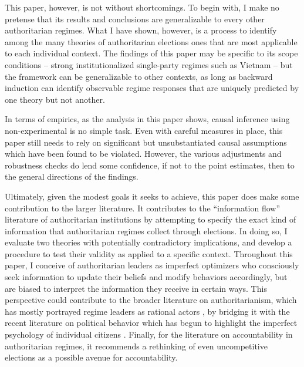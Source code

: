 \documentclass[12pt]{article}\usepackage[]{graphicx}\usepackage[]{color}
\newcommand{\1}{\mathbbm{1}}
\begin{document}
This paper, however, is not without shortcomings. To begin with, I make no pretense that its results and conclusions are generalizable to every other authoritarian regimes. What I have shown, however, is a process to identify among the many theories of authoritarian elections ones that are most applicable to each individual context. The findings of this paper may be specific to its scope conditions -- strong institutionalized single-party regimes such as Vietnam -- but the framework can be generalizable to other contexts, as long as backward induction can identify observable regime responses that are uniquely predicted by one theory but not another. 

In terms of empirics, as the analysis in this paper shows, causal inference using non-experimental is no simple task. Even with careful measures in place, this paper still needs to rely on significant but unsubstantiated causal assumptions which have been found to be violated. However, the various adjustments and robustness checks do lend some confidence, if not to the point estimates, then to the general directions of the findings.

Ultimately, given the modest goals it seeks to achieve, this paper does make some contribution to the larger literature. It contributes to the ``information flow'' literature of authoritarian institutions by attempting to specify the exact kind of information that authoritarian regimes collect through elections. In doing so, I evaluate two theories with potentially contradictory implications, and develop a procedure to test their validity as applied to a specific context. Throughout this paper, I conceive of authoritarian leaders as imperfect optimizers who consciously seek information to update their beliefs and modify behaviors accordingly, but are biased to interpret the information they receive in certain ways. This perspective could contribute to the broader literature on authoritarianism, which has mostly portrayed regime leaders as rational actors \citep[e.g.][]{AR2001}, by bridging it with the recent literature on political behavior which has begun to highlight the imperfect psychology of individual citizens \citep[e.g.][]{AchenBartels2016}. Finally, for the literature on accountability in authoritarian regimes, it recommends a rethinking of even uncompetitive elections as a possible avenue for accountability.



\newpage
\appendix
\end{document}
